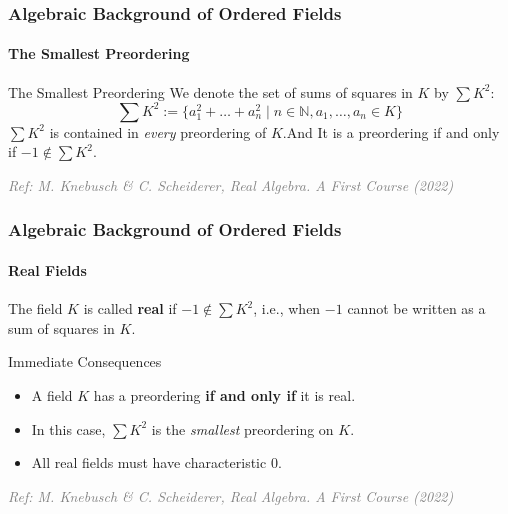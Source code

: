 \documentclass[11pt]{beamer}
\begin{document}
\begin{frame}
    \frametitle{Algebraic Background of Ordered Fields}
    \framesubtitle{The Smallest Preordering}

        \begin{block}{The Smallest Preordering}
        We denote the set of sums of squares in $K$ by $\sum K^2$:
        \vspace{-0.8em}
        \[ \sum K^2 := \{a_1^2 + \dots + a_n^2 \mid n \in \mathbb{N}, a_1, \dots, a_n \in K\} \]
        \vspace{-0.1em}
        $\sum K^2$ is contained in \emph{every} preordering of $K$.And It is a preordering if and only if $ -1 \notin \sum K^2$.
    \end{block}

    \vspace*{\fill}
    \hfill \textcolor{gray}{\tiny \textit{Ref: M. Knebusch \& C. Scheiderer, Real Algebra. A First Course (2022)}}
\end{frame}

\begin{frame}
    \frametitle{Algebraic Background of Ordered Fields}
    \framesubtitle{Real Fields}

    \begin{definition}
        The field $K$ is called \textbf{real} if $-1 \notin \sum K^2$, i.e., when $-1$ cannot be written as a sum of squares in $K$.
    \end{definition}

    \vspace{0.4em}
    
    \begin{alertblock}{Immediate Consequences}
        \begin{itemize}
            \setlength{\itemsep}{0.3em}
            \item A field $K$ has a preordering \textbf{if and only if} it is real.
            \item In this case, $\sum K^2$ is the \emph{smallest} preordering on $K$.
            \item All real fields must have characteristic $0$.
        \end{itemize}
    \end{alertblock}

    \vspace*{\fill}
    \hfill \textcolor{gray}{\tiny \textit{Ref: M. Knebusch \& C. Scheiderer, Real Algebra. A First Course (2022)}}
\end{frame}
\end{document}
